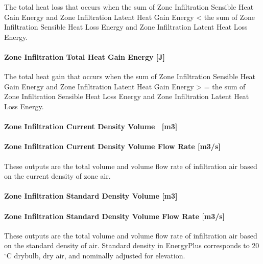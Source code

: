 The total heat loss that occurs when the sum of Zone Infiltration Sensible Heat Gain Energy and Zone Infiltration Latent Heat Gain Energy \textless{} the sum of Zone Infiltration Sensible Heat Loss Energy and Zone Infiltration Latent Heat Loss Energy.

\paragraph{Zone Infiltration Total Heat Gain Energy {[}J{]}}\label{zone-infiltration-total-heat-gain-energy-j}

The total heat gain that occurs when the sum of Zone Infiltration Sensible Heat Gain Energy and Zone Infiltration Latent Heat Gain Energy \textgreater{} = the sum of Zone Infiltration Sensible Heat Loss Energy and Zone Infiltration Latent Heat Loss Energy.

\paragraph{Zone Infiltration Current Density Volume~ {[}m3{]}}\label{zone-infiltration-current-density-volume-m3}

\paragraph{Zone Infiltration Current Density Volume Flow Rate {[}m3/s{]}}\label{zone-infiltration-current-density-volume-flow-rate-m3s}

These outputs are the total volume and volume flow rate of infiltration air based on the current density of zone air.

\paragraph{Zone Infiltration Standard Density Volume {[}m3{]}}\label{zone-infiltration-standard-density-volume-m3}

\paragraph{Zone Infiltration Standard Density Volume Flow Rate {[}m3/s{]}}\label{zone-infiltration-standard-density-volume-flow-rate-m3s}

These outputs are the total volume and volume flow rate of infiltration air based on the standard density of air. Standard density in EnergyPlus corresponds to 20$^\circ$C drybulb, dry air, and nominally adjusted for elevation.

